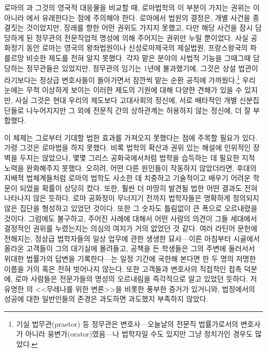 로마의 과 그것의 영국적 대응물을 비교할 때,
로마법학의 이 부분이 가지는 권위는 이 아니라
에서 유래한다는 점에 주의해야 한다.
로마에서 법원의 결정은, 개별 사건을 종결짓는 것이었지만,
장래를 향한 어떤 권위도 가지지 못했고, 다만
해당 사건을 잠시 담당하게 된 정무관의 전문직업적 명성에 의해 주어지는
권위만 누릴 뿐이었다.
사실 공화정기 동안 로마는 영국의 왕좌법원이나
신성로마제국의 제실법원,
프랑스왕국의 파를르망 비슷한 제도를 전혀 알지 못했다.
각자 맡은 분야의 사법적 기능을 그때그때 담당하는 정무관들은 있었지만,
정무관의 임기는 1년에 불과했기에, 그것은 상설 법관이라기보다는
정상급 변호사들이 돌아가면서 잠깐씩 맡는 순환 공직에 가까웠다.\footnote{%
  기실
  법무관(praetor) 등 정무관은 변호사---오늘날의 전문직 법률가로서의
  변호사가 아니라 웅변가(orator)였음---나 법학자일 수도 있지만
  그냥 정치가인 경우도 많았다.}
우리 눈에는 무척 이상하게 보이는 이러한 제도의 기원에 대해 다양한 견해가 있을 수 있지만,
사실 그것은 현대 우리의 제도보다 고대사회의 정신에,
서로 배타적인 개별 신분집단들로 나누어지지만
그 외에 전문직 간의 상하관계는 허용하지 않는 정신에, 더 잘 부합했다.

이 체제는 그로부터 기대할 법한 효과를 가져오지 못했다는 점에 주목할 필요가 있다.
가령 그것은 로마법을 하지 못했다.
비록 법학의 확산과 권위 있는 해설에 인위적인 장벽을 두지는 않았으나,
몇몇 그리스 공화국에서처럼 법학을 습득하는 데 필요한 지적 노력을 완화해주지 못했다.
오히려, 어떤 다른 원인들이 작동하지 않았더라면, 후대의 지배적 법체계들처럼 로마의 법학도
사소한 데 치중하고 기술적이고 배우기 어려운 학문이 되었을 확률이 상당히 컸다.
또한, 훨씬 더 마땅히 발견될 법한 어떤 결과도 전혀 나타나지 않은 듯하다.
로마 공화정이 무너지기 전까지 법학자들은 명확하게 정의되지 않은 집단을 형성하고 있었던 것이다.
또한 그 숫자도 틀림없이 큰 폭으로 오르내렸을 것이다.
그럼에도 불구하고, 주어진 사례에 대해서 어떤 사람의 의견이 그들 세대에서 결정적인 권위를
누렸는지는 의심의 여지가 거의 없었던 것 같다.
여러 라틴어 문헌에 전해지는, 정상급 법학자들의 일상 업무에 관한
생생한 묘사---이른 아침부터
시골에서 올라온 고객들이 그의 대기실에 몰려들고,
공책을 든 학생들은 그의 주변에 둘러서서 위대한
법률가의 답변을 기록한다---는 일정 기간에 국한해 본다면
한 두 명의 저명한 이름을 거의 혹은 전혀 벗어나지 않는다.
또한 고객들과 변호사의 직접적인 접촉 덕분에,
로마 사람들은 전문가들의 명성의 오르내림을 즉각적으로 알고 있었던 듯하다.
저 유명한 의 <<무레나를 위한 변론>>을 비롯한 풍부한 증거가
있거니와, 법정에서의 성공에 대한 일반인들의 존경은 과도하면 과도했지 부족하지 않았다.

